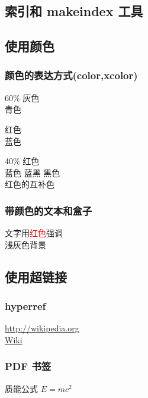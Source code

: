 \documentclass[12pt,UTF8]{ctexart}%
\begin{document}
\subsection{索引和 makeindex 工具}

\subsection{使用颜色}

\subsubsection{颜色的表达方式(color,xcolor)}

\large\sffamily
{\color[gray]{0.6}
60\% 灰色} \\
{\color[rgb]{0,1,1}
青色}

\large\sffamily
{\color{red} 红色} \\
{\color{blue} 蓝色}

\large\sffamily
{\color{red!40} 40\% 红色}\\
{\color{blue}蓝色
\color{blue!50!black}蓝黑
\color{black}黑色}\\
{\color{-red}红色的互补色}

\subsubsection{带颜色的文本和盒子}

\sffamily
文字用\textcolor{red}{红色}强调\\
\colorbox[gray]{0.95}{浅灰色背景} \\


\subsection{使用超链接}


\subsubsection{hyperref}

\url{http://wikipedia.org} \\
\href{http://wikipedia.org}{Wiki}


\subsubsection{PDF 书签}

质能公式 \texorpdfstring{$E=mc^2$}{E=mc\textasciicircum 2}
\end{document}
